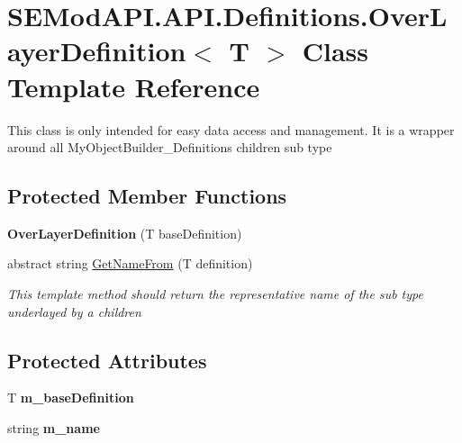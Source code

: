 \hypertarget{class_s_e_mod_a_p_i_1_1_a_p_i_1_1_definitions_1_1_over_layer_definition}{}\section{S\+E\+Mod\+A\+P\+I.\+A\+P\+I.\+Definitions.\+Over\+Layer\+Definition$<$ T $>$ Class Template Reference}
\label{class_s_e_mod_a_p_i_1_1_a_p_i_1_1_definitions_1_1_over_layer_definition}


This class is only intended for easy data access and management. It is a wrapper around all My\+Object\+Builder\+\_\+\+Definitions children sub type  


\subsection*{Protected Member Functions}
\begin{DoxyCompactItemize}
\item 
\hypertarget{class_s_e_mod_a_p_i_1_1_a_p_i_1_1_definitions_1_1_over_layer_definition_a3132d23f54cba45beb603e4f5833fbb5}{}{\bfseries Over\+Layer\+Definition} (T base\+Definition)\label{class_s_e_mod_a_p_i_1_1_a_p_i_1_1_definitions_1_1_over_layer_definition_a3132d23f54cba45beb603e4f5833fbb5}

\item 
abstract string \hyperlink{class_s_e_mod_a_p_i_1_1_a_p_i_1_1_definitions_1_1_over_layer_definition_af48cb6a6a26d25dc6634b6e7dbf6cd5a}{Get\+Name\+From} (T definition)
\begin{DoxyCompactList}\small\item\em This template method should return the representative name of the sub type underlayed by a children \end{DoxyCompactList}\end{DoxyCompactItemize}
\subsection*{Protected Attributes}
\begin{DoxyCompactItemize}
\item 
\hypertarget{class_s_e_mod_a_p_i_1_1_a_p_i_1_1_definitions_1_1_over_layer_definition_a388dac4033e6cec26fc0f6b374d860fc}{}T {\bfseries m\+\_\+base\+Definition}\label{class_s_e_mod_a_p_i_1_1_a_p_i_1_1_definitions_1_1_over_layer_definition_a388dac4033e6cec26fc0f6b374d860fc}

\item 
\hypertarget{class_s_e_mod_a_p_i_1_1_a_p_i_1_1_definitions_1_1_over_layer_definition_a9901ee89417c5a2fc1cdb7d8acb6c925}{}string {\bfseries m\+\_\+name}\label{class_s_e_mod_a_p_i_1_1_a_p_i_1_1_definitions_1_1_over_layer_definition_a9901ee89417c5a2fc1cdb7d8acb6c925}

\end{DoxyCompactItemize}
